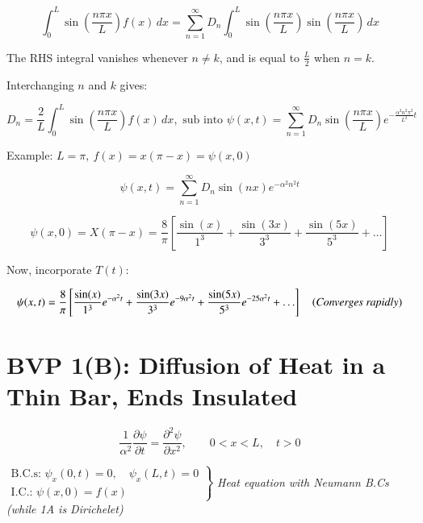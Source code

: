 \documentclass{report}
\begin{document}
$$
\displaystyle\int_0^L \sin\left(\frac{n \pi x}{L}\right) f(x) \, dx = \sum\limits_{n=1}^\infty D_n \displaystyle\int_0^L \sin\left(\dfrac{n \pi x}{L}\right) \sin\left(\dfrac{n \pi x}{L}\right) \, dx
$$

The RHS integral vanishes whenever $n \neq k$, and is equal to $\frac{L}{2}$ when $n = k$.

Interchanging $n$ and $k$ gives:

\[
\boxed{
D_n = \dfrac{2}{L} \int_0^L \sin\left(\dfrac{n \pi x}{L}\right) f(x) \, dx,\text{ sub into } 
\psi(x,t)=\sum\limits_{n=1}^{\infty} D_n \sin\left(\dfrac{n\pi x}{L}\right) 
e^{-\frac{\alpha^2n^2\pi^2}{L^2}t}
}
\]

Example: $L=\pi,\ f(x)=x(\pi-x)=\psi(x,0)$\\

\begin{center}
\end{center}

$$
\psi(x,t)=\sum\limits_{n=1}^{\infty}D_n\sin(nx)e^{-\alpha^2n^2t}
$$

$$
\psi(x,0)=X(\pi-x)=\dfrac{8}{\pi}\left[\dfrac{\sin(x)}{1^3}+\dfrac{\sin(3x)}{3^3}+\dfrac{\sin(5x)}{5^3}+\ldots\right]
$$

Now, incorporate $T(t)$:

$$
\psi(x,t)=\dfrac{8}{\pi}\left[\dfrac{\sin(x)}{1^3}e^{-\alpha^2t}+\dfrac{\sin(3x)}{3^3}e^{-9\alpha^2t}+\dfrac{\sin(5x)}{5^3}e^{-25\alpha^2t}+\ldots\right]\quad \text{(\textit{Converges rapidly})}
$$

\section{BVP 1(B): Diffusion of Heat in a Thin Bar, Ends Insulated}

$$\dfrac{1}{\alpha^2}\dfrac{\partial \psi}{\partial t}=\dfrac{\partial^2\psi}{\partial x^2},\qquad 0<x<L,\quad t>0$$

$\left.\begin{array}{l}
     \text{B.C.s: } \psi_x(0,t)=0,\quad \psi_x(L,t)=0\\
     \text{I.C.: } \psi(x,0)=f(x) 
\end{array}\right\}$ \textit{Heat equation with Neumann B.Cs (while 1A is Dirichelet)}
\end{document}
